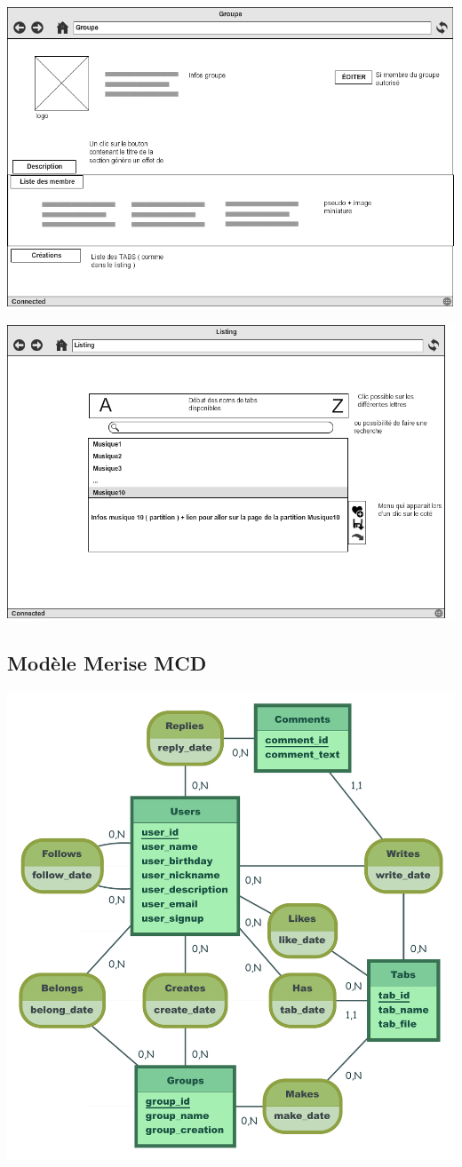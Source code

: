 \documentclass[a4paper]{article}
\begin{document}
\centerline{\includegraphics[scale=0.6]{Group}}
\centerline{\includegraphics[scale=0.6]{Listing}}

\subsection{Modèle Merise MCD}
\centerline{\includegraphics[scale=0.8]{MCD_MLD_Music}}
\end{document}
